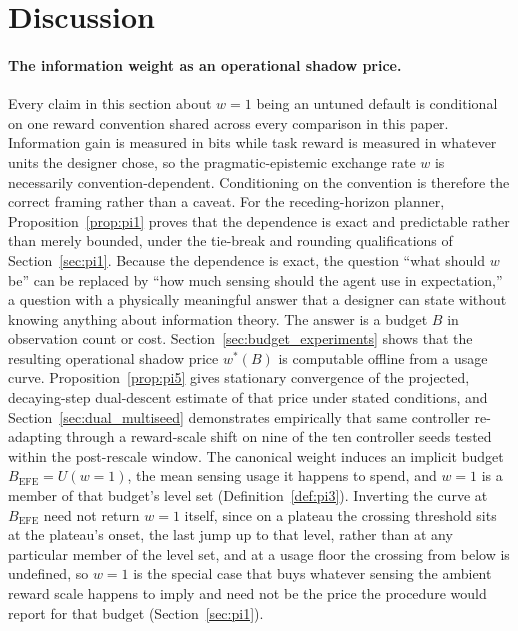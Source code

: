 \section{Discussion}
\label{sec:discussion}

\paragraph{The information weight as an operational shadow price.}
Every claim in this section about $w{=}1$ being an untuned default is conditional on one reward convention shared across every comparison in this paper. Information gain is measured in bits while task reward is measured in whatever units the designer chose, so the pragmatic-epistemic exchange rate $w$ is necessarily convention-dependent. Conditioning on the convention is therefore the correct framing rather than a caveat. For the receding-horizon planner, Proposition~\ref{prop:pi1} proves that the dependence is exact and predictable rather than merely bounded, under the tie-break and rounding qualifications of Section~\ref{sec:pi1}. Because the dependence is exact, the question ``what should $w$ be'' can be replaced by ``how much sensing should the agent use in expectation,'' a question with a physically meaningful answer that a designer can state without knowing anything about information theory. The answer is a budget $B$ in observation count or cost. Section~\ref{sec:budget_experiments} shows that the resulting operational shadow price $w^*(B)$ is computable offline from a usage curve. Proposition~\ref{prop:pi5} gives stationary convergence of the projected, decaying-step dual-descent estimate of that price under stated conditions, and Section~\ref{sec:dual_multiseed} demonstrates empirically that same controller re-adapting through a reward-scale shift on nine of the ten controller seeds tested within the post-rescale window. The canonical weight induces an implicit budget $B_{\mathrm{EFE}} = U(w{=}1)$, the mean sensing usage it happens to spend, and $w{=}1$ is a member of that budget's level set (Definition~\ref{def:pi3}). Inverting the curve at $B_{\mathrm{EFE}}$ need not return $w{=}1$ itself, since on a plateau the crossing threshold sits at the plateau's onset, the last jump up to that level, rather than at any particular member of the level set, and at a usage floor the crossing from below is undefined, so $w{=}1$ is the special case that buys whatever sensing the ambient reward scale happens to imply and need not be the price the procedure would report for that budget (Section~\ref{sec:pi1}).

